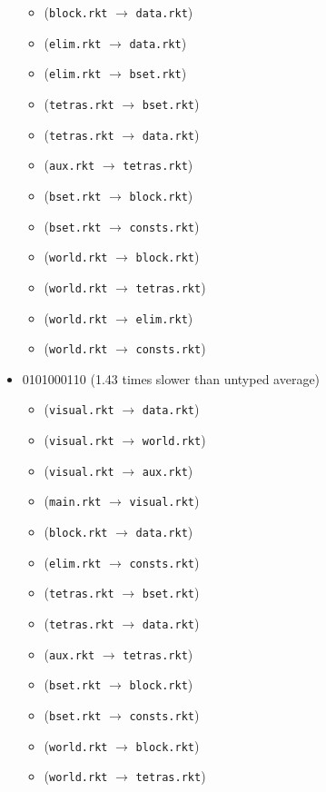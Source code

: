 \documentclass{article}
\newcommand{\mono}[1]{\texttt{#1}}
\begin{document}
\begin{itemize}
\begin{itemize}
  \item (\mono{block.rkt} $\rightarrow$ \mono{data.rkt})
  \item (\mono{elim.rkt} $\rightarrow$ \mono{data.rkt})
  \item (\mono{elim.rkt} $\rightarrow$ \mono{bset.rkt})
  \item (\mono{tetras.rkt} $\rightarrow$ \mono{bset.rkt})
  \item (\mono{tetras.rkt} $\rightarrow$ \mono{data.rkt})
  \item (\mono{aux.rkt} $\rightarrow$ \mono{tetras.rkt})
  \item (\mono{bset.rkt} $\rightarrow$ \mono{block.rkt})
  \item (\mono{bset.rkt} $\rightarrow$ \mono{consts.rkt})
  \item (\mono{world.rkt} $\rightarrow$ \mono{block.rkt})
  \item (\mono{world.rkt} $\rightarrow$ \mono{tetras.rkt})
  \item (\mono{world.rkt} $\rightarrow$ \mono{elim.rkt})
  \item (\mono{world.rkt} $\rightarrow$ \mono{consts.rkt})
  \end{itemize}
\item 0101000110 (1.43 times slower than untyped average)
  \begin{itemize}
  \item (\mono{visual.rkt} $\rightarrow$ \mono{data.rkt})
  \item (\mono{visual.rkt} $\rightarrow$ \mono{world.rkt})
  \item (\mono{visual.rkt} $\rightarrow$ \mono{aux.rkt})
  \item (\mono{main.rkt} $\rightarrow$ \mono{visual.rkt})
  \item (\mono{block.rkt} $\rightarrow$ \mono{data.rkt})
  \item (\mono{elim.rkt} $\rightarrow$ \mono{consts.rkt})
  \item (\mono{tetras.rkt} $\rightarrow$ \mono{bset.rkt})
  \item (\mono{tetras.rkt} $\rightarrow$ \mono{data.rkt})
  \item (\mono{aux.rkt} $\rightarrow$ \mono{tetras.rkt})
  \item (\mono{bset.rkt} $\rightarrow$ \mono{block.rkt})
  \item (\mono{bset.rkt} $\rightarrow$ \mono{consts.rkt})
  \item (\mono{world.rkt} $\rightarrow$ \mono{block.rkt})
  \item (\mono{world.rkt} $\rightarrow$ \mono{tetras.rkt})

\end{itemize}
\end{itemize}
\end{document}
